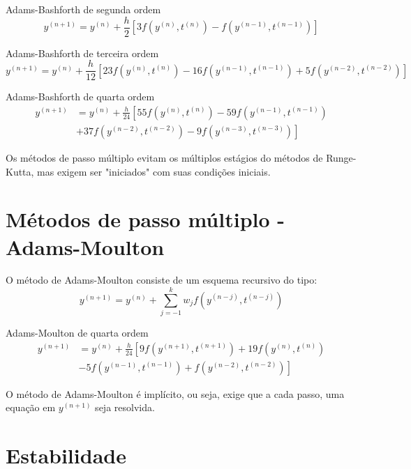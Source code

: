 \begin{ex} Adams-Bashforth de segunda ordem
$$y^{(n+1)}=y^{(n)}+\frac{h}{2}\left[3f\left(y^{(n)},t^{(n)}\right)-f\left(y^{(n-1)},t^{(n-1)}\right)\right]$$
\end{ex}
\begin{ex} Adams-Bashforth de terceira ordem
$$y^{(n+1)}=y^{(n)}+\frac{h}{12}\left[23f\left(y^{(n)},t^{(n)}\right)-16f\left(y^{(n-1)},t^{(n-1)}\right)+5f\left(y^{(n-2)},t^{(n-2)}\right)\right]$$
\end{ex}
\begin{ex} Adams-Bashforth de quarta ordem
  \begin{equation*}
    \begin{split}
      y^{(n+1)} &= y^{(n)} + \frac{h}{24}\left[55f\left(y^{(n)},t^{(n)}\right)-59f\left(y^{(n-1)},t^{(n-1)}\right)\right.\\
        &+\left. 37f\left(y^{(n-2)},t^{(n-2)}\right)-9f\left(y^{(n-3)},t^{(n-3)}\right)\right]    
    \end{split}
  \end{equation*}
\end{ex}
Os métodos de passo múltiplo evitam os múltiplos estágios do métodos de Runge-Kutta, mas exigem ser "iniciados" com suas condições iniciais.

\section{Métodos de passo múltiplo - Adams-Moulton}

O método de Adams-Moulton consiste de um esquema recursivo do tipo:
$$y^{(n+1)}=y^{(n)}+\sum_{j=-1}^k w_jf(y^{(n-j)},t^{(n-j)})$$

\begin{ex} Adams-Moulton de quarta ordem
  \begin{equation*}
    \begin{split}
      y^{(n+1)} &= y^{(n)} + \frac{h}{24}\left[9f\left(y^{(n+1)},t^{(n+1)}\right) + 19f\left(y^{(n)},t^{(n)}\right) \right.\\
      &-\left. 5f\left(y^{(n-1)},t^{(n-1)}\right) + f\left(y^{(n-2)},t^{(n-2)}\right)\right]      
    \end{split}
  \end{equation*}
$$$$
\end{ex}
O método de Adams-Moulton é implícito, ou seja, exige que a cada passo, uma equação em $y^{(n+1)}$ seja resolvida.

\section{Estabilidade}

